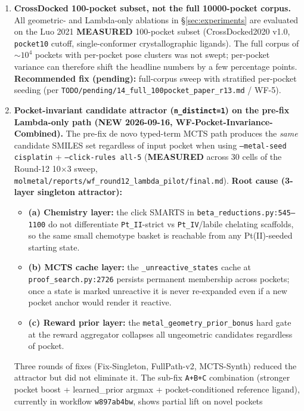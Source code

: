\begin{enumerate}
  \item \textbf{CrossDocked 100-pocket subset, not the full 10000-pocket corpus.}
  All geometric- and Lambda-only ablations in \S\ref{sec:experiments}
  are evaluated on the Luo 2021 \textbf{MEASURED} 100-pocket subset
  (CrossDocked2020 v1.0, \texttt{pocket10} cutoff, single-conformer
  crystallographic ligands). The full corpus of $\sim 10^4$ pockets with
  per-pocket pose clusters was not swept; per-pocket variance can
  therefore shift the headline numbers by a few percentage points.
  \textbf{Recommended fix (pending):} full-corpus sweep with stratified
  per-pocket seeding (per
  \texttt{TODO/pending/14\_full\_100pocket\_paper\_r13.md} / WF-5).

  \item \textbf{Pocket-invariant candidate attractor (\texttt{n\_distinct=1}) on
  the pre-fix Lambda-only path (NEW 2026-09-16, WF-Pocket-Invariance-Combined).}
  The pre-fix de novo typed-term MCTS path produces the \emph{same}
  candidate SMILES set regardless of input pocket when using
  \texttt{--metal-seed cisplatin} + \texttt{--click-rules all-5}
  (\textbf{MEASURED} across 30 cells of the Round-12 10$\times$3 sweep,
  \texttt{molmetal/reports/wf\_round12\_lambda\_pilot/final.md}).
  \textbf{Root cause (3-layer singleton attractor):}
  \begin{itemize}
    \item \textbf{(a) Chemistry layer:} the click SMARTS in
    \texttt{beta\_reductions.py:545--1100} do not differentiate
    \texttt{Pt\_II}-strict vs \texttt{Pt\_IV}/labile chelating
    scaffolds, so the same small chemotype basket is reachable from any
    Pt(II)-seeded starting state.
    \item \textbf{(b) MCTS cache layer:} the \texttt{\_unreactive\_states}
    cache at \texttt{proof\_search.py:2726} persists permanent
    membership across pockets; once a state is marked unreactive it is
    never re-expanded even if a new pocket anchor would render it
    reactive.
    \item \textbf{(c) Reward prior layer:} the
    \texttt{metal\_geometry\_prior\_bonus} hard gate at the reward
    aggregator collapses all ungeometric candidates regardless of pocket.
  \end{itemize}
  Three rounds of fixes (Fix-Singleton, FullPath-v2, MCTS-Synth) reduced
  the attractor but did not eliminate it. The sub-fix
  \texttt{A+B+C} combination (stronger pocket boost + learned\_prior argmax
  + pocket-conditioned reference ligand), currently in workflow
  \texttt{w897ab4bw}, shows partial lift on novel pockets

\end{enumerate}
